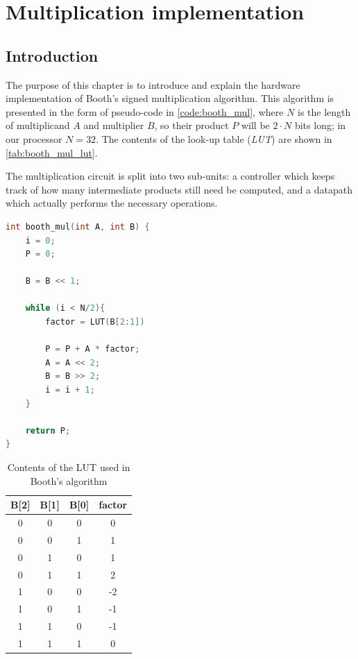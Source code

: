 \chapter{Multiplication implementation}\label{Chpater_Impl_mul}
\section{Introduction}
The purpose of this chapter is to introduce and explain the hardware implementation of Booth's signed multiplication algorithm.
This algorithm is presented in the form of pseudo-code in \autoref{code:booth_mul}, where $N$ is the length of multiplicand $A$ and multiplier $B$, so their product $P$ will be $2 \cdot N$ bits long; in our processor $N = 32$.
The contents of the look-up table (\textit{LUT}) are shown in \autoref{tab:booth_mul_lut}.

The multiplication circuit is split into two sub-units: a controller which keeps track of how many intermediate products still need be computed, and a datapath which actually performs the necessary operations.

\begin{lstlisting}[label={code:booth_mul}, caption={The C-like psuedo code implementing the radix-4 booth multiplication}, language=C]
int booth_mul(int A, int B) {
    i = 0;
    P = 0;
    
    B = B << 1;

    while (i < N/2){
        factor = LUT(B[2:1])
    
        P = P + A * factor;
        A = A << 2;
        B = B >> 2;
        i = i + 1;
    }

    return P;
}
\end{lstlisting}
\begin{table}[]
    \centering
    \begin{tabular}{|c|c|c|c|}
        \hline
         B[2] & B[1] & B[0] & factor\\
         \hline
          0 & 0 & 0 & 0\\
         0 & 0 & 1 & 1\\
         0 & 1 & 0 & 1\\
         0 & 1 & 1 & 2\\
         1 & 0 & 0 & -2\\
         1 & 0 & 1 & -1\\
         1 & 1 & 0 & -1\\
         1 & 1 & 1 & 0\\
         \hline 
    \end{tabular}
    \caption{Contents of the LUT used in Booth's algorithm}
    \label{tab:booth_mul_lut}
\end{table}

